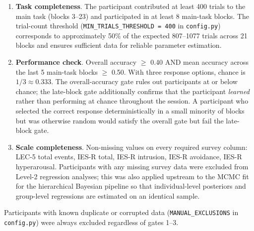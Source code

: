 \documentclass{article}
\providecommand{\tightlist}{%
  \setlength{\itemsep}{0pt}\setlength{\parskip}{0pt}}
\begin{document}
\begin{enumerate}
\def\labelenumi{\arabic{enumi}.}
\tightlist
\item
  \textbf{Task completeness}. The participant contributed at least 400
  trials to the main task (blocks 3--23) and participated in at least 8
  main-task blocks. The trial-count threshold
  (\texttt{MIN\_TRIALS\_THRESHOLD\ =\ 400} in \texttt{config.py})
  corresponds to approximately 50\% of the expected 807--1077 trials
  across 21 blocks and ensures sufficient data for reliable parameter
  estimation.
\item
  \textbf{Performance check}. Overall accuracy \(\geq\) 0.40 AND mean
  accuracy across the last 5 main-task blocks \(\geq\) 0.50. With three
  response options, chance is \(1/3 \approx 0.333\). The
  overall-accuracy gate rules out participants at or below chance; the
  late-block gate additionally confirms that the participant
  \emph{learned} rather than performing at chance throughout the
  session. A participant who selected the correct response
  deterministically in a small minority of blocks but was otherwise
  random would satisfy the overall gate but fail the late-block gate.
\item
  \textbf{Scale completeness}. Non-missing values on every required
  survey column: LEC-5 total events, IES-R total, IES-R intrusion, IES-R
  avoidance, IES-R hyperarousal. Participants with any missing survey
  data were excluded from Level-2 regression analyses; this was also
  applied upstream to the MCMC fit for the hierarchical Bayesian
  pipeline so that individual-level posteriors and group-level
  regressions are estimated on an identical sample.
\end{enumerate}

Participants with known duplicate or corrupted data
(\texttt{MANUAL\_EXCLUSIONS} in \texttt{config.py}) were always excluded
regardless of gates 1--3.
\end{document}
